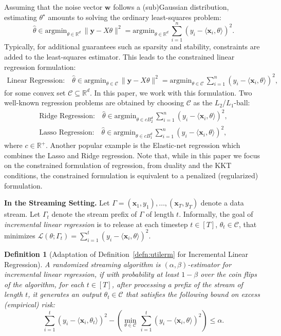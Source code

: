 \documentclass{article}
\theoremstyle{plain}
\newtheorem{definition}{Definition}
\def \y {\mathbf y}
\def \CCC {\mathcal{C}}
\def \LLL {\mathcal{L}}
\def \x {\mathbf x}
\def \w {\mathbf w}
\def \R {\mathbb{R}}
\begin{document}
Assuming that the noise vector $\w$ follows a (sub)Gaussian distribution, estimating $\theta^\star$ amounts to solving the ordinary least-squares problem: 
$$\hat{\theta} \in \mbox{argmin}_{\theta \in \R^d}\, \| \y - X \theta \|^2 = \mbox{argmin}_{\theta \in \R^d}\, \sum_{i=1}^n (y_i - \langle \x_i,\theta \rangle)^2.$$
Typically, for additional guarantees such as sparsity and stability, constraints are added to the least-squares estimator. This leads to the constrained linear regression formulation:
\begin{align} \label{eqn:genlinearreg}
\mbox{Linear Regression:} \quad \hat{\theta} \in \mbox{argmin}_{\theta \in \CCC}\, \| \y - X \theta \|^2 = \mbox{argmin}_{\theta \in \CCC}\, \sum_{i=1}^n (y_i - \langle \x_i,\theta \rangle)^2,
\end{align}
for some convex set $\CCC \subseteq \R^d$. In this paper, we work with this formulation. Two well-known regression problems are obtained by choosing $\CCC$ as the $L_2$/$L_1$-ball:
\begin{eqnarray*}
&\mbox{Ridge Regression:} \quad \hat{\theta} \in \mbox{argmin}_{\theta \in c B_2^d}\, \sum_{i=1}^n (y_i - \langle \x_i,\theta \rangle)^2,& \nonumber \\
&\mbox{Lasso Regression:} \quad \hat{\theta} \in \mbox{argmin}_{\theta \in c B_1^d}\, \sum_{i=1}^n (y_i - \langle \x_i,\theta \rangle)^2,&
\end{eqnarray*}
where $c \in \R^+$.
Another popular example is the Elastic-net regression which combines the Lasso and Ridge regression. Note that, while in this paper we focus on the constrained formulation of regression, from duality and the KKT conditions, the constrained formulation is equivalent to a penalized (regularized) formulation. 

\smallskip
\noindent\textbf{In the Streaming Setting.} Let $\Gamma = (\x_1,y_1),\dots,(\x_T,y_T)$ denote a data stream. Let $\Gamma_t$ denote the stream prefix of $\Gamma$ of length $t$. Informally, the goal of {\em incremental linear regression} is to release at each timestep $t \in [T]$, $\theta_t \in \CCC$, that minimizes $\LLL(\theta;\Gamma_t) = \sum_{i=1}^t (y_i - \langle \x_i,\theta\rangle)^2$. 

\begin{definition} [Adaptation of Definition~\ref{defn:utilerm} for Incremental Linear Regression] \label{defn:utililr}
A randomized streaming algorithm is $(\alpha,\beta)$-{\em estimator} for incremental linear regression, if with probability at least $1 -\beta$ over the coin flips of the algorithm, for each $t \in [T]$, after processing a prefix of the stream of length $t$, it generates an output $\theta_t \in \CCC$ that satisfies the following bound on excess (empirical) risk:
$$\sum_{i=1}^t (y_i - \langle \x_i,\theta_t\rangle)^2 - \left ( \min_{\theta \in \CCC}\, \sum_{i=1}^t (y_i - \langle \x_i,\theta\rangle)^2 \right ) \leq \alpha.$$ 
\end{definition}
\end{document}
